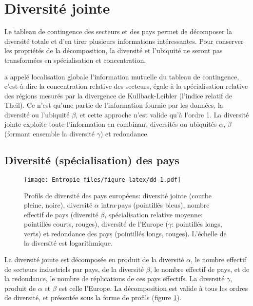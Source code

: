 \documentclass[fleqn,10pt]{ArtEcoFoG} %
\begin{document}
\section{Diversité jointe}\label{diversite-jointe}

Le tableau de contingence des secteurs et des pays permet de décomposer
la diversité totale et d'en tirer plusieurs informations intéressantes.
Pour conserver les propriétés de la décomposition, la diversité et
l'ubiquité ne seront pas transformées en spécialisation et
concentration.

\citet{Cutrini2010} a appelé localisation globale l'information mutuelle
du tableau de contingence, c'est-à-dire la concentration relative des
secteurs, égale à la spécialisation relative des régions mesurés par la
divergence de Kullback-Leibler (l'indice relatif de Theil). Ce n'est
qu'une partie de l'information fournie par les données, la diversité ou
l'ubiquité \(\beta\), et cette approche n'est valide qu'à l'ordre 1. La
diversité jointe exploite toute l'information en combinant diversités ou
ubiquités \(\alpha\), \(\beta\) (formant ensemble la diversité
\(\gamma\)) et redondance.

\subsection{Diversité (spécialisation) des
pays}\label{diversite-specialisation-des-pays}

\begin{figure}
\centering
\texttt{[image: Entropie\_files/figure-latex/dd-1.pdf]}
\caption{\label{fig:dd}Profils de diversité des pays européens: diversité
jointe (courbe pleine, noire), diversité \(\alpha\) intra-pays
(pointillés bleus), nombre effectif de pays (diversité \(\beta\),
spécialisation relative moyenne: pointillés courts, rouges), diversité
de l'Europe (\(\gamma\): pointillés longs, verts) et redondance des pays
(pointillés longs, rouges). L'échelle de la diversité est
logarithmique.}
\end{figure}

La diversité jointe est décomposée en produit de la diversité
\(\alpha\), le nombre effectif de secteurs industriels par pays, de la
diversité \(\beta\), le nombre effectif de pays, et de la redondance, le
nombre de réplications de ces pays effectifs. La diversité \(\gamma\),
produit de \(\alpha\) et \(\beta\) est celle l'Europe. La décomposition
est valide à tous les ordres de diversité, et présentée sous la forme de
profils (figure \ref{fig:dd}).
\end{document}
